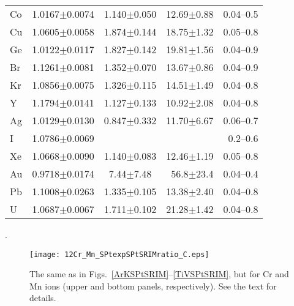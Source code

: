 \documentclass[aps,pra,twocolumn,amsmath,amssymb,floatfix]{revtex4-2}
\begin{document}
\begin{table}[!h]
\begin{ruledtabular}
\begin{tabular}{lccrr}
  Co                                    & 1.0167$\pm$0.0074 & 1.140$\pm$0.050 & 12.69$\pm$0.88 &   0.04--0.5  \\
  Cu\footnotemark[2]  & 1.0605$\pm$0.0058 & 1.874$\pm$0.144 & 18.75$\pm$1.32 &   0.05--0.8  \\
  Ge                                    & 1.0122$\pm$0.0117 & 1.827$\pm$0.142 & 19.81$\pm$1.56 &   0.04--0.9  \\
  Br                                     & 1.1261$\pm$0.0081 & 1.352$\pm$0.070 & 13.67$\pm$0.86 &   0.04--0.9  \\
  Kr \footnotemark[4]  & 1.0856$\pm$0.0075 & 1.326$\pm$0.115 & 14.51$\pm$1.49 &   0.04--0.8  \\
   Y                                      & 1.1794$\pm$0.0141 & 1.127$\pm$0.133 & 10.92$\pm$2.08  &   0.04--0.8  \\
  Ag                                    & 1.0129$\pm$0.0130 & 0.847$\pm$0.332 & 11.70$\pm$6.67  &   0.06--0.7  \\
    I                                     & 1.0786$\pm$0.0069 &                                      &                                    &    0.2--0.6    \\
  Xe                                    & 1.0668$\pm$0.0090 & 1.140$\pm$0.083 & 12.46$\pm$1.19  &   0.05--0.8   \\
  Au                                    & 0.9718$\pm$0.0174 & 7.44$\pm$7.48      & 56.8$\pm$23.4    &   0.04--0.4   \\
  Pb                                    & 1.1008$\pm$0.0263 & 1.335$\pm$0.105  & 13.38$\pm$2.40  &   0.04--0.8  \\
   U                                     & 1.0687$\pm$0.0067 & 1.711$\pm$0.102  & 21.28$\pm$1.42  &   0.04--0.8  \\
\end{tabular}
\end{ruledtabular}
.
\end{table}

\begin{figure}[!h]   %
\begin{center}
\texttt{[image: 12Cr\_Mn\_SPtexpSPtSRIMratio\_C.eps]}
\caption{\label{CrMnSPtSRIM} The same as in Figs.~\ref{ArKSPtSRIM}--\ref{TiVSPtSRIM}, but for Cr and Mn ions (upper and bottom panels, respectively). See the text for details.}
\end{center}
\end{figure}
\end{document}
